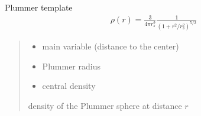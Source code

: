 \documentclass[letterpaper,10pt,english]{sphinxmanual}
\begin{document}
\begin{fulllineitems}
\label{\detokenize{diffsph.profiles:diffsph.profiles.templates.plmm}}
\pysigstartsignatures
{}
\pysigstopsignatures
\sphinxAtStartPar
Plummer template
\begin{equation*}
\begin{split}\rho(r) = \frac3{4\pi r_s^3}\frac1{(1+r^2/r_s^2)^{5/2}}\end{split}
\end{equation*}\begin{quote}\begin{description}
\begin{itemize}
\item {} 
\sphinxAtStartPar
{} \textendash{} main variable (distance to the center)

\item {} 
\sphinxAtStartPar
{} \textendash{} Plummer radius

\item {} 
\sphinxAtStartPar
{} \textendash{} central density

\end{itemize}

\sphinxAtStartPar
density of the Plummer sphere at distance \(r\)

\end{description}\end{quote}

\end{fulllineitems}

\end{document}
